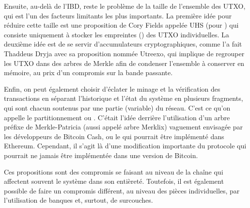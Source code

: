 Ensuite, au-delà de l'IBD, reste le problème de la taille de l'ensemble des UTXO, qui est l'un des facteurs limitants les plus importants. La première idée pour réduire cette taille est une proposition de Cory Fields appelée UHS (pour ) qui consiste uniquement à stocker les empreintes () des UTXO individuelles. La deuxième idée est de se servir d'accumulateurs cryptographiques, comme l'a fait Thaddeus Dryja avec sa proposition nommée Utreexo, qui implique de regrouper les UTXO dans des arbres de Merkle afin de condenser l'ensemble à conserver en mémoire, au prix d'un compromis sur la bande passante. %


Enfin, on peut également choisir d'éclater le minage et la vérification des transactions en séparant l'historique et l'état du système en plusieurs fragments, qui sont chacun soutenus par une partie (variable) du réseau. C'est ce qu'on appelle le partitionnement ou . C'était l'idée derrière l'utilisation d'un arbre préfixe de Merkle-Patricia (aussi appelé arbre Merklix) vaguement envisagée par les développeurs de Bitcoin Cash, ou le  qui pourrait être implémenté dans Ethereum. Cependant, il s'agit là d'une modification importante du protocole qui pourrait ne jamais être implémentée dans une version de Bitcoin.

%
Ces propositions sont des compromis se faisant au niveau de la chaîne qui affectent souvent le système dans son entièreté. Toutefois, il est également possible de faire un compromis différent, au niveau des pièces individuelles, par l'utilisation de banques et, surtout, de surcouches.

